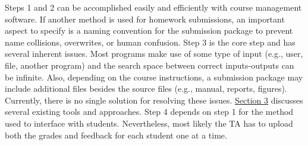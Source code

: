 \tab Steps 1 and 2 can be accomplished easily and efficiently with course management software.
If another method is used for homework submissions, an important aspect to specify 
is a naming convention for the submission package
to prevent name collisions, overwrites, or human confusion.
Step 3 is the core step and has several inherent issues.
Most programs make use of some type of input (e.g., user, file, another program) and
the search space between correct inputs-outputs can be infinite.
Also, depending on the course instructions, a submission package may include
additional files besides the source files (e.g., manual, reports, figures).
Currently, there is no single solution for resolving these issues.
\hyperref[sec:litreview]{Section 3} discusses several existing tools and approaches.
Step 4 depends on step 1 for the method used to interface with students.
Nevertheless, most likely the TA has to upload both the grades and feedback
for each student one at a time.


